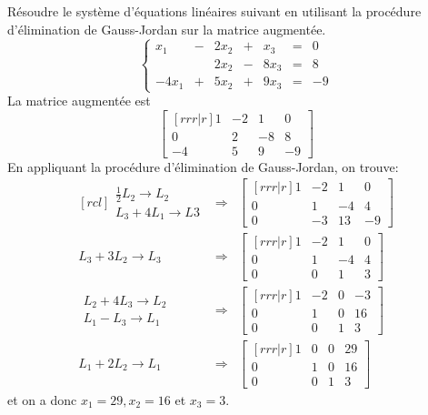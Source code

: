 \begin{exemple}
	Résoudre le système d'équations linéaires suivant en utilisant la procédure d'élimination de Gauss-Jordan
	sur la matrice augmentée.
	\[
	\left\{ \begin{matrix}
		x_1 &-& 2x_2 &+& x_3 &=& 0\\
		&& 2x_2 &-& 8x_3 &=& 8\\
		-4x_1 &+& 5x_2 &+& 9x_3 &=& -9
		\end{matrix}\right.
	\]
	\solution
	La matrice augmentée est
	\[
	\begin{bmatrix}[rrr|r]
		1 & -2& 1 & 0\\
		0 &2& -8& 8\\
		-4 & 5 & 9 & -9
	\end{bmatrix}
	\]
	En appliquant la procédure d'élimination de Gauss-Jordan, on trouve:
	\[
        \begin{matrix}[rcl]
        \begin{matrix}
        \frac{1}{2} L_2 \rightarrow L_2\\
        L_3 + 4L_1 \rightarrow L3
        \end{matrix}
         &\Longrightarrow&
        	\begin{bmatrix}[rrr|r]
		1 & -2& 1 & 0\\
		0 & 1 & -4 & 4\\
		0 &-3& 13& -9
	\end{bmatrix}
	\\[20pt]
		L_3 + 3L_2 \rightarrow L_3
		&\Longrightarrow&
        	\begin{bmatrix}[rrr|r]
		1 & -2& 1 & 0\\
		 0 & 1 & -4 & 4\\
		0 &0& 1& 3
	\end{bmatrix}
	\\[20pt]
	\begin{matrix}
	L_2 + 4 L_3 \rightarrow L_2 \\
	L_1 - L_3 \rightarrow L_1
	\end{matrix}
	&\Longrightarrow&
        	\begin{bmatrix}[rrr|r]
		1 & -2& 0 & -3\\
		 0 & 1 & 0 & 16\\
		0 &0& 1& 3
	\end{bmatrix}
	\\[20pt]
        L_1 + 2L_2 \rightarrow L_1
	&\Longrightarrow&
        	\begin{bmatrix}[rrr|r]
		1 & 0& 0 & 29\\
		 0 & 1 & 0 & 16\\
		0 &0& 1& 3
	\end{bmatrix}
        \end{matrix}
	\]
	et on a donc $x_1=29, x_2=16$ et $x_3=3$.
\end{exemple}

